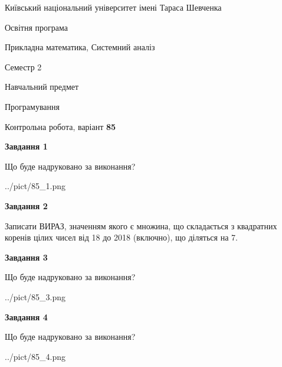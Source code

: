 \documentclass[12pt, ukrainian]{article}
\begin{document}
{{\begin {small}\par
{ \center  Київський національний університет імені Тараса Шевченка \par}
{\parbox {5 cm}{Освітня програма \hfill}{\parbox {8 cm}{Прикладна математика, Системний аналіз \hfill}}\parbox {5 cm}{\hfill Семестр 2}}\par
{\parbox {5 cm} {Навчальний предмет \hfill}\parbox {7 cm}{Програмування \hfill}\parbox {6cm}{\hfill}\par}\vspace{-7pt} \end{small}}{\center Контрольна робота, варіант  \No \textbf
{ 85 }\par}}
{
\begin {large}
{\begin {center}\textbf{Завдання 1}\end {center}}\par
Що буде надруковано за виконання?\par\par
\begin{center}
	{../pict/85_1.png}
\end{center}
\newpage

{\begin {center}\textbf{Завдання 2}\end {center}}\par
Записати ВИРАЗ, значенням якого є множина, що складається з квадратних корен\-ів цілих чисел від 18 до 2018 (включно), що діляться на 7.\par
\newpage

{\begin {center}\textbf{Завдання 3}\end {center}}\par
Що буде надруковано за виконання?
\begin{center}
	{../pict/85_3.png}
\end{center}
\newpage

{\begin {center}\textbf{Завдання 4}\end {center}}\par
Що буде надруковано за виконання?\par
\begin{center}
	{../pict/85_4.png}
\end{center}
\newpage


\end{large}}
\end{document}

